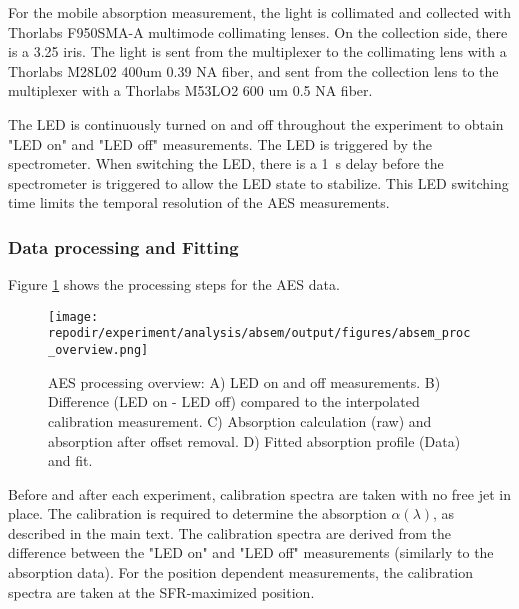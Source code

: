 For the mobile absorption measurement, the light is collimated and collected with Thorlabs F950SMA-A multimode collimating lenses. On the collection side, there is a 3.25  iris. The light is sent from the multiplexer to the collimating lens with a Thorlabs M28L02 400um 0.39 NA fiber, and sent from the collection lens to the multiplexer with a Thorlabs M53LO2 600 um 0.5 NA fiber. 

The LED is continuously turned on and off throughout the experiment to obtain "LED on" and "LED off" measurements. The LED is triggered by the spectrometer. When switching the LED, there is a \SI{1}{\second} delay before the spectrometer is triggered to allow the LED state to stabilize. This LED switching time limits the temporal resolution of the AES measurements. 

\subsubsection{Data processing and Fitting}

Figure \ref{fig:SI_AES_proc_overview} shows the processing steps for the AES data.


\begin{figure}[]
    \centering
    \texttt{[image: \\repodir/experiment/analysis/absem/output/figures/absem\_proc\_overview.png]}
    \caption{AES processing overview: A) LED on and off measurements. B) Difference (LED on - LED off) compared to the interpolated calibration measurement. C) Absorption calculation (raw) and absorption after offset removal. D) Fitted absorption profile (Data) and fit.}
    \label{fig:SI_AES_proc_overview}
\end{figure}


Before and after each experiment, calibration spectra are taken with no free jet in place. The calibration is required to determine the absorption $\alpha(\lambda)$, as described in the main text.  The calibration spectra are derived from the difference between the "LED on" and "LED off" measurements (similarly to the absorption data). For the position dependent measurements, the calibration spectra are taken at the SFR-maximized position. 



